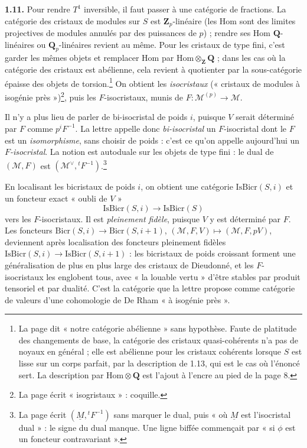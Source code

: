 \documentclass[11pt,a4paper]{article}
\begin{document}
\textbf{1.11.} Pour rendre $T^1$ inversible, il faut passer à une catégorie de
fractions. La catégorie des cristaux de modules sur $S$ est
$\mathbf{Z}_p$-linéaire (les $\mathrm{Hom}$ sont des limites projectives de
modules annulés par des puissances de $p$) ; rendre ses $\mathrm{Hom}$
$\mathbf{Q}$-linéaires ou $\mathbf{Q}_p$-linéaires revient au même. Pour les
cristaux de type fini, c'est garder les mêmes objets et remplacer
$\mathrm{Hom}$ par $\mathrm{Hom} \otimes_{\mathbf{Z}} \mathbf{Q}$ ; dans les
cas où la catégorie des cristaux est abélienne, cela revient à quotienter par
la sous-catégorie épaisse des objets de torsion.\footnote{La page dit
« notre catégorie abélienne » sans hypothèse. Faute de platitude des
changements de base, la catégorie des cristaux quasi-cohérents n'a pas de
noyaux en général ; elle est abélienne pour les cristaux cohérents lorsque $S$
est lisse sur un corps parfait, par la description de 1.13, qui est le cas où
l'énoncé sert. La description par $\mathrm{Hom} \otimes \mathbf{Q}$ est
l'ajout à l'encre au pied de la page 8.} On obtient les \emph{isocristaux}
(« cristaux de modules à isogénie près »)\footnote{La page écrit
« isogristaux » : coquille.}, puis les $F$-isocristaux, munis de
$F : \mathcal{M}^{(p)} \to \mathcal{M}$.

Il n'y a plus lieu de parler de bi-isocristal de poids $i$, puisque $V$ serait
déterminé par $F$ comme $p^iF^{-1}$. La lettre appelle donc
\emph{bi-isocristal} un $F$-isocristal dont le $F$ est un \emph{isomorphisme},
sans choisir de poids : c'est ce qu'on appelle aujourd'hui un
\emph{$F$-isocristal}. La notion est autoduale sur les objets de type fini :
le dual de $(\mathcal{M}, F)$ est $(\mathcal{M}^\vee, {}^tF^{-1})$.\footnote{La
page écrit $(\underline{M}, {}^tF^{-1})$ sans marquer le dual, puis « où
$\underline{M}$ est l'isocristal dual » : le signe du dual manque. Une ligne
biffée commençait par « si $\phi$ est un foncteur contravariant ».}

En localisant les bicristaux de poids $i$, on obtient une catégorie
$\mathrm{IsBicr}(S,i)$ et un foncteur exact « oubli de $V$ »
\[
  \mathrm{IsBicr}(S,i) \longrightarrow \mathrm{IsBicr}(S)
\]
vers les $F$-isocristaux. Il est \emph{pleinement fidèle}, puisque $V$ y est
déterminé par $F$. Les foncteurs
$\mathrm{Bicr}(S,i) \to \mathrm{Bicr}(S,i+1)$,
$(\mathcal{M}, F, V) \mapsto (\mathcal{M}, F, pV)$, deviennent après
localisation des foncteurs pleinement fidèles
$\mathrm{IsBicr}(S,i) \to \mathrm{IsBicr}(S,i+1)$ : les bicristaux de poids
croissant forment une généralisation de plus en plus large des cristaux de
Dieudonné, et les $F$-isocristaux les englobent tous, avec « la louable vertu »
d'être stables par produit tensoriel et par dualité. C'est la catégorie que la
lettre propose comme catégorie de valeurs d'une cohomologie de De Rham « à
isogénie près ».
\end{document}
